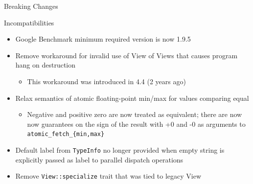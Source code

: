 
\begin{frame}[fragile]

  {\Huge Breaking Changes}

  \vspace{10pt}

\end{frame}


\begin{frame}[fragile]{Incompatibilities}
  \begin{itemize}
      \item Google Benchmark minimum required version is now 1.9.5
      \item Remove workaround for invalid use of View of Views that causes program hang on destruction
      \begin{itemize}
        \item This workaround was introduced in 4.4 (2 years ago)
      \end{itemize}
      \item Relax semantics of atomic floating-point min/max for values comparing equal
      \begin{itemize}
        \item Negative and positive zero are now treated as equivalent; there are now now guarantees on the sign of the result with +0 and -0 as arguments to \texttt{atomic\_fetch\_\{min,max\}}
      \end{itemize}
      \item Default label from \texttt{TypeInfo} no longer provided when empty string is explicitly passed as label to parallel dispatch operations
      \item Remove \texttt{View::specialize} trait that was tied to legacy View
  \end{itemize}
\end{frame}


